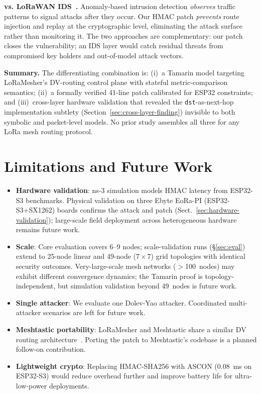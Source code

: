 \documentclass[10pt,journal,compsoc]{IEEEtran}
\begin{document}
\textbf{vs. LoRaWAN IDS~\cite{bringye2026-lorawan-ids}.}
Anomaly-based intrusion detection \emph{observes} traffic patterns to
signal attacks after they occur.
Our HMAC patch \emph{prevents} route injection and replay at the
cryptographic level, eliminating the attack surface rather than
monitoring it.
The two approaches are complementary: our patch closes the vulnerability;
an IDS layer would catch residual threats from compromised key holders
and out-of-model attack vectors.

\textbf{Summary.}
The differentiating combination is: (i)~a Tamarin model targeting
LoRaMesher's DV-routing control plane with stateful metric-comparison
semantics; (ii)~a formally verified 41-line patch calibrated for
ESP32 constraints; and (iii)~cross-layer hardware validation that
revealed the \texttt{dst}-as-next-hop implementation subtlety
(Section~\ref{sec:cross-layer-finding}) invisible to both symbolic
and packet-level models.
No prior study assembles all three for any LoRa mesh routing protocol.

\section{Limitations and Future Work}
\label{sec:limitations}

\begin{itemize}
  \item \textbf{Hardware validation}: ns-3 simulation models HMAC
    latency from ESP32-S3 benchmarks. Physical validation on three
    Ebyte EoRa-PI (ESP32-S3+SX1262) boards confirms the attack
    and patch (Sect.~\ref{sec:hardware-validation}); large-scale
    field deployment across heterogeneous hardware remains future work.

  \item \textbf{Scale}: Core evaluation covers 6–9 nodes;
    scale-validation runs (§\ref{sec:eval}) extend to 25-node linear and
    49-node ($7\times7$) grid topologies with identical security outcomes.
    Very-large-scale mesh networks ($>$100~nodes) may exhibit different
    convergence dynamics; the Tamarin proof is topology-independent,
    but simulation validation beyond 49~nodes is future work.

  \item \textbf{Single attacker}: We evaluate one Dolev-Yao
    attacker. Coordinated multi-attacker scenarios are left for
    future work.

  \item \textbf{Meshtastic portability}: LoRaMesher and Meshtastic
    share a similar DV routing architecture~\cite{cve2025-meshtastic-entropy}.
    Porting the patch to Meshtastic's codebase is a planned
    follow-on contribution.

  \item \textbf{Lightweight crypto}: Replacing HMAC-SHA256 with
    ASCON (0.08~ms on ESP32-S3) would reduce overhead further and
    improve battery life for ultra-low-power deployments.
\end{itemize}
\end{document}
